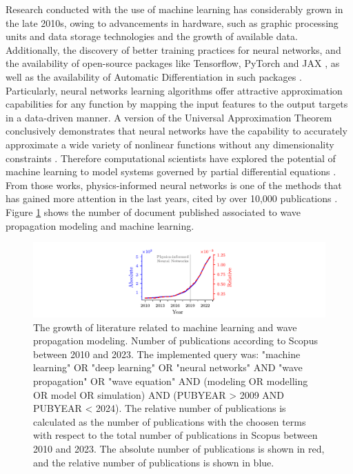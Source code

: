 \documentclass[11pt,twoside]{article}
\begin{document}
Research conducted with the use of machine learning has considerably grown in the late 2010s, owing to advancements 
in hardware, such as graphic processing units and data storage technologies and the growth of available data. 
Additionally, the discovery of better training practices for neural networks, and the availability of open-source 
packages like Tensorflow, PyTorch and JAX \citep{abadi_tensorflow_2016,paszke_pytorch_2019,jax2018github}, as well 
as the availability of Automatic Differentiation in such packages \citep{paszke_automatic_2017,baydin_automatic_2017}. 
Particularly, neural networks learning algorithms offer attractive approximation capabilities for any function by 
mapping the input features to the output targets in a data-driven manner. A version of the Universal Approximation 
Theorem conclusively demonstrates that neural networks have the capability to accurately approximate a wide 
variety of nonlinear functions without any dimensionality constraints \citep{barron_universal_1993}. Therefore 
computational scientists have explored the potential of machine learning to model systems governed 
by partial differential equations \citep{cuomo_scientific_2022,karniadakis_physics-informed_2021}. From those
works, physics-informed neural networks is one of the methods that has gained more attention in the last years,
cited by over 10,000 publications \citep{Raissi2019}. Figure \ref{fig:publications_absolute_relative} shows the 
number of document published associated to wave propagation modeling and machine learning. 


\begin{figure}[H]
\centering
    \includegraphics[width=1.0\textwidth]{figs/publications_abs_relat.pdf}
    \caption{The growth of literature related to machine learning and wave propagation modeling. Number of publications 
    according to Scopus between 2010 and 2023. The implemented query was: "machine learning" OR "deep learning" 
    OR "neural networks" AND "wave propagation" OR "wave equation" AND (modeling OR modelling OR model OR simulation) 
    AND (PUBYEAR > 2009 AND PUBYEAR < 2024). The relative number of publications is calculated as the number of
    publications with the choosen terms with respect to the total number of publications in Scopus between 2010 and 2023.
    The absolute number of publications is shown in red, and the relative number of publications is shown in blue.} 
    \label{fig:publications_absolute_relative}
\end{figure}
\end{document}
